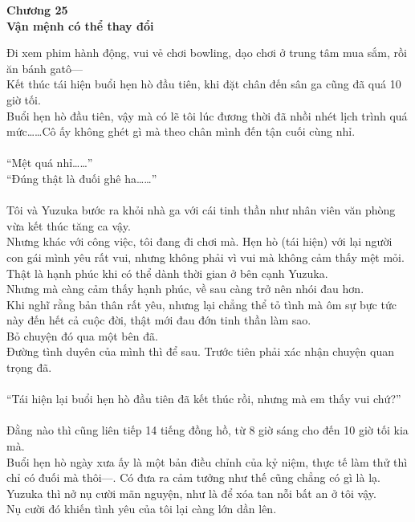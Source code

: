 \documentclass[12pt,a4paper, twosides]{book}
\begin{document}
    \begin{center}
    \textbf{\large Chương 25 \\ Vận mệnh có thể thay đổi}
    \end{center}
    \noindent
Đi xem phim hành động, vui vẻ chơi bowling, dạo chơi ở trung tâm mua sắm, rồi ăn bánh gatô—\\
Kết thúc tái hiện buổi hẹn hò đầu tiên, khi đặt chân đến sân ga cũng đã quá 10 giờ tối.\\
Buổi hẹn hò đầu tiên, vậy mà có lẽ tôi lúc đương thời đã nhồi nhét lịch trình quá mức……Cô ấy không ghét gì mà theo chân mình đến tận cuối cùng nhỉ.\\
\\
“Mệt quá nhỉ……”\\
“Đúng thật là đuối ghê ha……”\\
\\
Tôi và Yuzuka bước ra khỏi nhà ga với cái tinh thần như nhân viên văn phòng vừa kết thúc tăng ca vậy.\\
Nhưng khác với công việc, tôi đang đi chơi mà. Hẹn hò (tái hiện) với lại người con gái mình yêu rất vui, nhưng không phải vì vui mà không cảm thấy mệt mỏi.\\
Thật là hạnh phúc khi có thể dành thời gian ở bên cạnh Yuzuka.\\
Nhưng mà càng cảm thấy hạnh phúc, về sau càng trở nên nhói đau hơn.\\
Khi nghĩ rằng bản thân rất yêu, nhưng lại chẳng thể tỏ tình mà ôm sự bực tức này đến hết cả cuộc đời, thật mới đau đớn tinh thần làm sao.\\
Bỏ chuyện đó qua một bên đã.\\
Đường tình duyên của mình thì để sau. Trước tiên phải xác nhận chuyện quan trọng đã.\\
\\
“Tái hiện lại buổi hẹn hò đầu tiên đã kết thúc rồi, nhưng mà em thấy vui chứ?”\\
\\
Đằng nào thì cũng liên tiếp 14 tiếng đồng hồ, từ 8 giờ sáng cho đến 10 giờ tối kia mà.\\
Buổi hẹn hò ngày xưa ấy là một bản điều chỉnh của kỷ niệm, thực tế làm thử thì chỉ có đuối mà thôi—. Có đưa ra cảm tưởng như thế cũng chẳng có gì là lạ.\\
Yuzuka thì nở nụ cười mãn nguyện, như là để xóa tan nỗi bất an ở tôi vậy.\\
Nụ cười đó khiến tình yêu của tôi lại càng lớn dần lên.\\
\\
\end{document}
